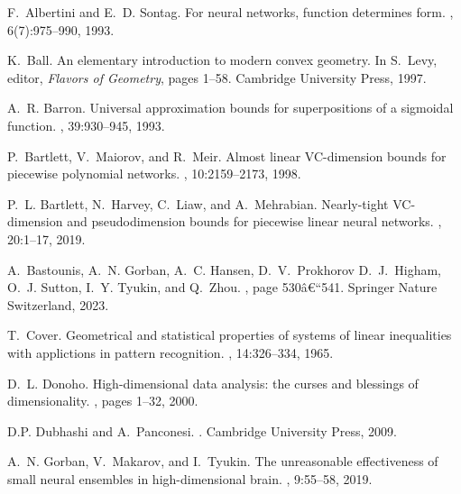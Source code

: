 \documentclass{elsarticle}
\begin{document}
\begin{thebibliography}{10}

F.~Albertini and E.~D. Sontag.
\newblock For neural networks, function determines form.
, 6(7):975--990, 1993.

K.~Ball.
\newblock An elementary introduction to modern convex geometry.
\newblock In S.~Levy, editor, {\em Flavors of Geometry}, pages 1--58. Cambridge
  University Press, 1997.

A.~R. Barron.
\newblock Universal approximation bounds for superpositions of a sigmoidal
  function.
, 39:930--945, 1993.

P.~Bartlett, V.~Maiorov, and R.~Meir.
\newblock Almost linear {VC}-dimension bounds for piecewise polynomial
  networks.
, 10:2159--2173, 1998.

P.~L. Bartlett, N.~Harvey, C.~Liaw, and A.~Mehrabian.
\newblock Nearly-tight {VC}-dimension and pseudodimension bounds for piecewise
  linear neural networks.
, 20:1--17, 2019.

A.~Bastounis, A.~N. Gorban, A.~C. Hansen, D.~V.~Prokhorov D.~J.~Higham, O.~J.
  Sutton, I.~Y. Tyukin, and Q.~Zhou.
, page 530â€“541.
\newblock Springer Nature Switzerland, 2023.

T.~Cover.
\newblock Geometrical and statistical properties of systems of linear
  inequalities with applictions in pattern recognition.
, 14:326--334, 1965.

D.~L. Donoho.
\newblock High-dimensional data analysis: the curses and blessings of
  dimensionality.
, pages 1--32, 2000.

D.P. Dubhashi and A.~Panconesi.
.
\newblock Cambridge University Press, 2009.

A.~N. Gorban, V.~Makarov, and I.~Tyukin.
\newblock The unreasonable effectiveness of small neural ensembles in
  high-dimensional brain.
, 9:55--58, 2019.


\end{thebibliography}
\end{document}
